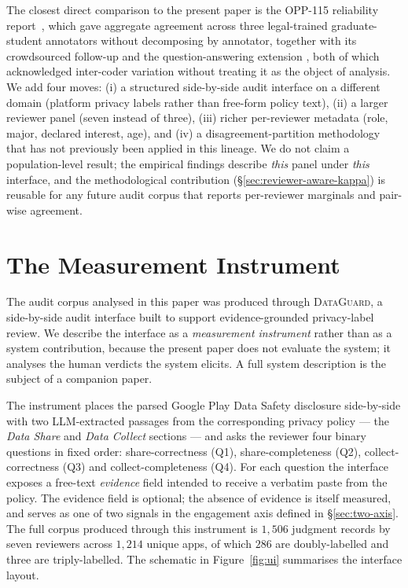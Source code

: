 \documentclass[11pt,a4paper]{article}
\newcommand{\dataguard}{\textsc{DataGuard}}
\begin{document}
The closest direct comparison to the present paper is the OPP-115
reliability report~\citep{wilson2016creation}, which gave aggregate
agreement across three legal-trained graduate-student annotators
without decomposing by annotator, together with its crowdsourced
follow-up \citep{wilson2016crowdsourcing} and the
question-answering extension \citep{ravichander2019question}, both
of which acknowledged inter-coder variation without treating it as
the object of analysis. We add four moves: (i) a structured
side-by-side audit interface on a different domain (platform
privacy labels rather than free-form policy text), (ii) a larger
reviewer panel (seven instead of three), (iii) richer per-reviewer
metadata (role, major, declared interest, age), and (iv) a
disagreement-partition methodology that has not previously been
applied in this lineage. We do not claim a population-level result;
the empirical findings describe \emph{this} panel under \emph{this}
interface, and the methodological contribution
(\S\ref{sec:reviewer-aware-kappa}) is reusable for any future audit
corpus that reports per-reviewer marginals and pair-wise agreement.

\section{The Measurement Instrument}
\label{sec:system}

The audit corpus analysed in this paper was produced through
\dataguard, a side-by-side audit interface built to support
evidence-grounded privacy-label review. We describe the interface
as a \emph{measurement instrument} rather than as a system
contribution, because the present paper does not evaluate the
system; it analyses the human verdicts the system elicits. A full
system description is the subject of a companion paper.

The instrument places the parsed Google Play Data Safety disclosure
\citep{googledatasafety2022} side-by-side with two LLM-extracted
passages from the corresponding privacy policy --- the
\emph{Data Share} and \emph{Data Collect} sections --- and asks the
reviewer four binary questions in fixed order: share-correctness
(Q1), share-completeness (Q2), collect-correctness (Q3) and
collect-completeness (Q4). For each question the interface exposes
a free-text \emph{evidence} field intended to receive a verbatim
paste from the policy. The evidence field is optional; the absence
of evidence is itself measured, and serves as one of two signals in
the engagement axis defined in \S\ref{sec:two-axis}. The full
corpus produced through this instrument is $1{,}506$ judgment
records by seven reviewers across $1{,}214$ unique apps, of which
$286$ are doubly-labelled and three are triply-labelled. The
schematic in Figure~\ref{fig:ui} summarises the interface layout.
\end{document}
